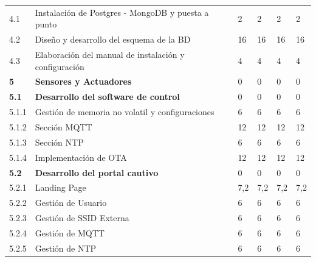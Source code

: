 \documentclass[11pt]{charter}
\begin{document}
\begin{tabularx}{\linewidth}{@{}|p{2cm}|p{11cm}|p{2.5cm}|p{2.5cm}|p{2.5cm}|p{2.5cm}|@{}}
4.1            & Instalación de Postgres -   MongoDB y puesta a punto                                          & 2    & 2    & 2    & 2    \\
4.2            & Diseño y desarrollo del esquema   de la BD                                                    & 16   & 16   & 16   & 16   \\
4.3            & Elaboración del manual de   instalación y configuración                                       & 4    & 4    & 4    & 4    \\
\textbf{5}     & \textbf{Sensores y Actuadores}                                                                & 0    & 0    & 0    & 0    \\
\textbf{5.1}   & \textbf{Desarrollo del software de   control}                                                 & 0    & 0    & 0    & 0    \\
5.1.1          & Gestión de memoria no volatil y   configuraciones                                             & 6    & 6    & 6    & 6    \\
5.1.2          & Sección MQTT                                                                                  & 12   & 12   & 12   & 12   \\
5.1.3          & Sección NTP                                                                                   & 6    & 6    & 6    & 6    \\
5.1.4          & Implementación de OTA                                                                         & 12   & 12   & 12   & 12   \\
\textbf{5.2}   & \textbf{Desarrollo del portal cautivo}                                                        & 0    & 0    & 0    & 0    \\
5.2.1          & Landing Page                                                                                  & 7,2  & 7,2  & 7,2  & 7,2  \\
5.2.2          & Gestión de Usuario                                                                            & 6    & 6    & 6    & 6    \\
5.2.3          & Gestión de SSID Externa                                                                       & 6    & 6    & 6    & 6    \\
5.2.4          & Gestión de MQTT                                                                               & 6    & 6    & 6    & 6    \\
5.2.5          & Gestión de NTP                                                                                & 6    & 6    & 6    & 6    \\

\end{tabularx}
\end{document}
